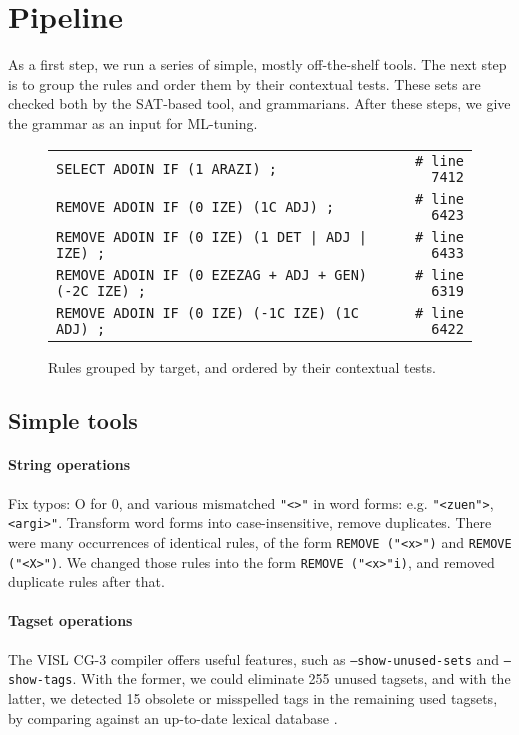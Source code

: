 \documentclass[11pt]{article}
\def\t#1{\texttt{#1}}
\begin{document}
\section{Pipeline}

As a first step, we run a series of simple, mostly off-the-shelf tools. 
The next step is to group the rules and order them by their contextual tests.
These sets are checked both by the SAT-based tool, and grammarians. After these
steps, we give the grammar as an input for ML-tuning.


\begin{figure*}[t]
\centering
\begin{tabular}{lr}
\t{SELECT ADOIN IF (1 ARAZI) ;}                         & \t{\# line 7412} \\
\t{REMOVE ADOIN IF (0 IZE) (1C ADJ) ;}                  & \t{\# line 6423} \\
\t{REMOVE ADOIN IF (0 IZE) (1 DET | ADJ | IZE) ;}       & \t{\# line 6433} \\
\t{REMOVE ADOIN IF (0 EZEZAG + ADJ + GEN) (-2C IZE) ;}  & \t{\# line 6319} \\
\t{REMOVE ADOIN IF (0 IZE) (-1C IZE) (1C ADJ) ;}        & \t{\# line 6422} \\
\end{tabular}
\caption{Rules grouped by target, and ordered by their contextual tests.}
\label{fig:sorted}
\end{figure*}



\subsection{Simple tools}

\paragraph{String operations}
Fix typos: O for 0, and various mismatched \texttt{"<>"} in word forms: e.g. \texttt{"<zuen">}, \texttt{<argi>"}.
Transform word forms into case-insensitive, remove duplicates. 
There were many occurrences of identical rules, of the form \texttt{REMOVE ("<x>")} and \texttt{REMOVE ("<X>")}. We changed those rules into the form \texttt{REMOVE ("<x>"i)}, and removed duplicate rules after that.

\paragraph{Tagset operations}
The VISL CG-3 compiler offers useful features, such as \texttt{--show-unused-sets} and \texttt{--show-tags}. With the former, we could eliminate 255 unused tagsets, and with the latter, we detected 15 obsolete or misspelled tags in the remaining used tagsets, by comparing against an up-to-date lexical database \cite{aldezabal2001edbl}.
\end{document}
